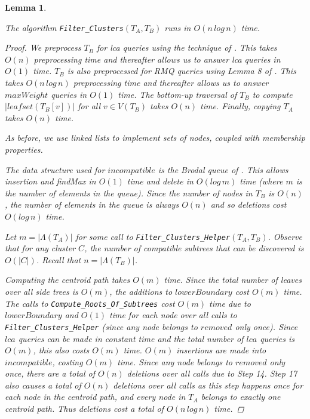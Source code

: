 \documentclass{article}
\newcommand{\leafset}{\Lambda}
\newtheorem{filterclustersruntime}[incompatibility]{Lemma}
\begin{document}
    \bigskip
    \begin{filterclustersruntime}
        \label{lem:filterclustersruntime}

        The algorithm \texttt{Filter\_Clusters}$(T_A, T_B)$ runs in $O(n\,log\,n)$ time.

        \begin{proof}
            We preprocess $T_B$ for \textit{lca} queries using the technique of \cite{bender2000lca}. This takes $O(n)$ preprocessing time and thereafter allows us to answer \textit{lca} queries in $O(1)$ time. $T_B$ is also preprocessed for RMQ queries using Lemma 8 of \cite{jansson2018algorithms}. This takes $O(n\,log\,n)$ preprocessing time and thereafter allows us to answer $maxWeight$ queries in $O(1)$ time. The bottom-up traversal of $T_B$ to compute $|leafset(T_B[v])|$ for all $v \in V(T_B)$ takes $O(n)$ time. Finally, copying $T_A$ takes $O(n)$ time.

            As before, we use linked lists to implement sets of nodes, coupled with membership properties.

            The data structure used for $incompatible$ is the Brodal queue of \cite{brodal1995fast}. This allows insertion and findMax in $O(1)$ time and delete in $O(log\,m)$ time (where $m$ is the number of elements in the queue). Since the number of nodes in $T_B$ is $O(n)$, the number of elements in the queue is always $O(n)$ and so deletions cost $O(log\,n)$ time.

            Let $m = |\leafset(T_A)|$ for some call to \texttt{Filter\_Clusters\_Helper}$(T_A, T_B)$. Observe that for any cluster $C$, the number of compatible subtrees that can be discovered is $O(|C|)$. Recall that $n = |\leafset(T_B)|$.

            Computing the centroid path takes $O(m)$ time. Since the total number of leaves over all side trees is $O(m)$, the additions to $lowerBoundary$ cost $O(m)$ time. The calls to \texttt{Compute\_Roots\_Of\_Subtrees} cost $O(m)$ time due to $lowerBoundary$ and $O(1)$ time for each node over all calls to \texttt{Filter\_Clusters\_Helper} (since any node belongs to $removed$ only once). Since $lca$ queries can be made in constant time and the total number of $lca$ queries is $O(m)$, this also costs $O(m)$ time. $O(m)$ insertions are made into $incompatible$, costing $O(m)$ time. Since any node belongs to $removed$ only once, there are a total of $O(n)$ deletions over all calls due to Step 14. Step 17 also causes a total of $O(n)$ deletions over all calls as this step happens once for each node in the centroid path, and every node in $T_A$ belongs to exactly one centroid path. Thus deletions cost a total of $O(n\,log\,n)$ time.


\end{proof}
\end{filterclustersruntime}
\end{document}
